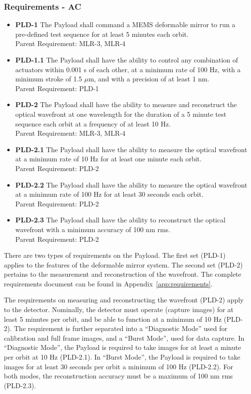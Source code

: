 \documentclass[12pt]{article}
\begin{document}
\subsubsection{Requirements - AC}\label{sec:payload_requirements}

\begin{itemize}
\item \textbf{PLD-1} The Payload shall command a MEMS deformable mirror to run a pre-defined test sequence for at least 5 minutes each orbit. \\ 
Parent Requirement: MLR-3, MLR-4
\item \textbf{PLD-1.1} The Payload shall have the ability to control any combination of actuators within 0.001 s of each other, at a minimum rate of 100 Hz, with a minimum stroke of 1.5  $\mu$m, and with a precision of at least 1 nm.\\
Parent Requirement: PLD-1
\item \textbf{PLD-2} The Payload shall have the ability to measure and reconstruct the optical wavefront at one wavelength for the duration of a 5 minute test sequence each orbit at a frequency of at least 10 Hz.\\
Parent Requirement: MLR-3, MLR-4
\item \textbf{PLD-2.1} The Payload shall have the ability to measure the optical wavefront at a minimum rate of 10 Hz for at least one minute each orbit.\\
Parent Requirement: PLD-2
\item \textbf{PLD-2.2} The Payload shall have the ability to measure the optical wavefront at a minimum rate of 100 Hz for at least 30 seconds each orbit.\\
Parent Requirement: PLD-2
\item \textbf{PLD-2.3} The Payload shall have the ability to reconstruct the optical wavefront with a minimum accuracy of 100 nm rms.\\
Parent Requirement: PLD-2
\end{itemize}

There are two types of requirements on the Payload.  The first set (PLD-1) applies to the features of the deformable mirror system.  The second set (PLD-2) pertains to the measurement and reconstruction of the wavefront.  The complete requirements document can be found in Appendix~\ref{app:requirements}. 

The requirements on measuring and reconstructing the wavefront (PLD-2) apply to the detector.  Nominally, the detector must operate (capture images) for at least 5 minutes per orbit, and be able to function at a minimum of 10 Hz (PLD-2). The requirement is further separated into a ``Diagnostic Mode'' used for calibration and full frame images, and a ``Burst Mode'', used for data capture.  In ``Diagnostic Mode'', the Payload is required to take images for at least a minute per orbit at 10 Hz (PLD-2.1).  In ``Burst Mode'', the Payload is required to take images for at least 30 seconds per orbit a minimum of 100 Hz (PLD-2.2).  For both modes, the reconstruction accuracy must be a maximum of 100 nm rms (PLD-2.3).
			
\end{document}
